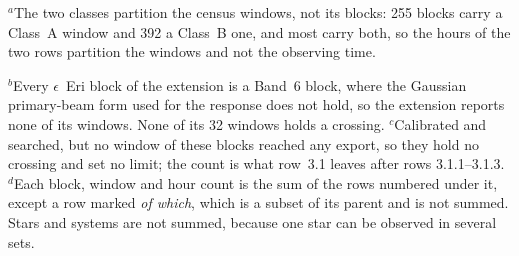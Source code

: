 {\footnotesize\raggedright $^{a}$The two classes partition the census windows, not its blocks: 255 blocks carry a Class~A window and 392 a Class~B one, and most carry both, so the hours of the two rows partition the windows and not the observing time.}

{\footnotesize\raggedright $^{b}$Every $\epsilon$~Eri block of the extension is a Band~6 block, where the Gaussian primary-beam form used for the response does not hold, so the extension reports none of its windows. None of its 32 windows holds a crossing. $^{c}$Calibrated and searched, but no window of these blocks reached any export, so they hold no crossing and set no limit; the count is what row~3.1 leaves after rows 3.1.1--3.1.3. $^{d}$Each block, window and hour count is the sum of the rows numbered under it, except a row marked \emph{of which}, which is a subset of its parent and is not summed. Stars and systems are not summed, because one star can be observed in several sets.}
